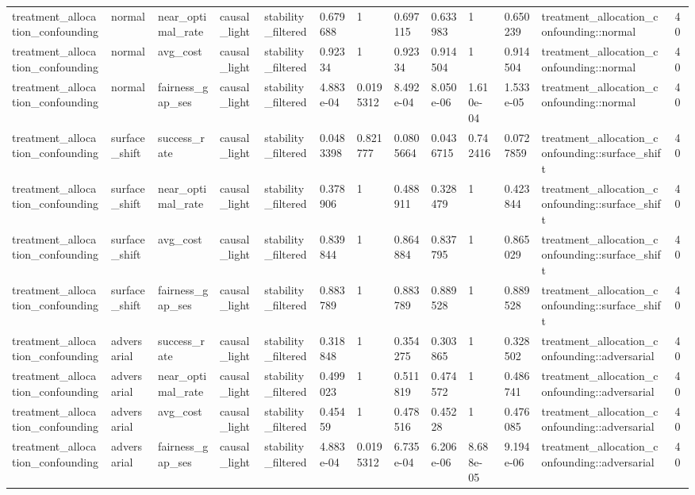 \begin{tabular}{lllllllllllll}
treatment\_allocation\_confounding & normal & near\_optimal\_rate & causal\_light & stability\_filtered & 0.679688 & 1 & 0.697115 & 0.633983 & 1 & 0.650239 & treatment\_allocation\_confounding::normal & 40 \\
treatment\_allocation\_confounding & normal & avg\_cost & causal\_light & stability\_filtered & 0.92334 & 1 & 0.92334 & 0.914504 & 1 & 0.914504 & treatment\_allocation\_confounding::normal & 40 \\
treatment\_allocation\_confounding & normal & fairness\_gap\_ses & causal\_light & stability\_filtered & 4.883e-04 & 0.0195312 & 8.492e-04 & 8.050e-06 & 1.610e-04 & 1.533e-05 & treatment\_allocation\_confounding::normal & 40 \\
treatment\_allocation\_confounding & surface\_shift & success\_rate & causal\_light & stability\_filtered & 0.0483398 & 0.821777 & 0.0805664 & 0.0436715 & 0.742416 & 0.0727859 & treatment\_allocation\_confounding::surface\_shift & 40 \\
treatment\_allocation\_confounding & surface\_shift & near\_optimal\_rate & causal\_light & stability\_filtered & 0.378906 & 1 & 0.488911 & 0.328479 & 1 & 0.423844 & treatment\_allocation\_confounding::surface\_shift & 40 \\
treatment\_allocation\_confounding & surface\_shift & avg\_cost & causal\_light & stability\_filtered & 0.839844 & 1 & 0.864884 & 0.837795 & 1 & 0.865029 & treatment\_allocation\_confounding::surface\_shift & 40 \\
treatment\_allocation\_confounding & surface\_shift & fairness\_gap\_ses & causal\_light & stability\_filtered & 0.883789 & 1 & 0.883789 & 0.889528 & 1 & 0.889528 & treatment\_allocation\_confounding::surface\_shift & 40 \\
treatment\_allocation\_confounding & adversarial & success\_rate & causal\_light & stability\_filtered & 0.318848 & 1 & 0.354275 & 0.303865 & 1 & 0.328502 & treatment\_allocation\_confounding::adversarial & 40 \\
treatment\_allocation\_confounding & adversarial & near\_optimal\_rate & causal\_light & stability\_filtered & 0.499023 & 1 & 0.511819 & 0.474572 & 1 & 0.486741 & treatment\_allocation\_confounding::adversarial & 40 \\
treatment\_allocation\_confounding & adversarial & avg\_cost & causal\_light & stability\_filtered & 0.45459 & 1 & 0.478516 & 0.45228 & 1 & 0.476085 & treatment\_allocation\_confounding::adversarial & 40 \\
treatment\_allocation\_confounding & adversarial & fairness\_gap\_ses & causal\_light & stability\_filtered & 4.883e-04 & 0.0195312 & 6.735e-04 & 6.206e-06 & 8.688e-05 & 9.194e-06 & treatment\_allocation\_confounding::adversarial & 40 \\

\end{tabular}
